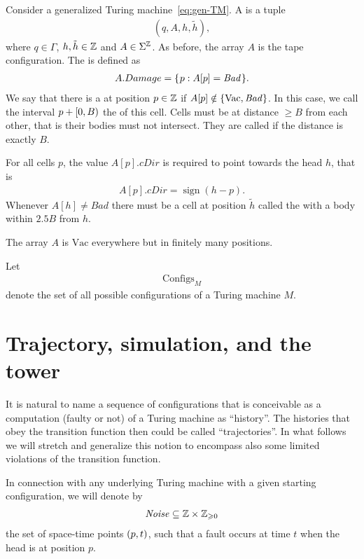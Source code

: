 \documentclass[12pt]{memoir}
\newcommand{\fld}[1]{\ensuremath{\textit{#1}}}
\newcommand{\sign}{\mathop\mathrm{sign}}
\def\B{B}
\newcommand{\Bad}{\mathit{Bad}}
\newcommand{\Configs}{\mathrm{Configs}}
\newcommand{\Damage}{Damage}
\newcommand{\h}{h}
\newcommand{\hc}{\tilde h}
\newcommand{\Noise}{\mathit{Noise}}
\newcommand{\cDir}{\fld{cDir}}
\newcommand{\Vacant}{\mathrm{Vac}}
\begin{document}
\begin{definition}[Configuration]\label{def:config}
     Consider a generalized Turing machine~\eqref{eq:gen-TM}.
    A  is a tuple
        \begin{align*}
             (q,A,\h,\hc),
        \end{align*}
    where \( q\in\Gamma \), \( \h,\hc\in\bbZ \) and \( A\in\Sigma^{\mathbb{Z}} \).
As before, the array \( A \) is the tape configuration.
The  is defined as
     \begin{align*}
          A.\Damage=\setOf{p}{A[p]=\Bad}.
     \end{align*}
We say that there is a  at position \( p\in\mathbb{Z} \) if
\( A[p]\notin \set{\Vacant, \Bad} \).
In this case, we call the interval \( p+\lint{0}{\B} \) the  of this cell.
Cells must be at distance \( \ge\B \) from each other, that is their
bodies must not intersect.
They are called  if the distance is exactly \( \B \).

For all cells \( p \), the value \( A[p].\cDir \) is required to point towards 
the head \( \h \), that is 
 \begin{align*}
   A[p].\cDir=\sign(\h-p).
 \end{align*}
Whenever \( A[\h]\neq \Bad \) there must be a
cell at position \( \hc \) called the  with a body 
within \( 2.5\B \) from \( \h \).

The array \( A \) is \( \Vacant \) everywhere but in finitely many positions.

Let
    \begin{align*}
         \Configs_{M}
    \end{align*}
    denote the set of all possible configurations
    of a Turing machine \( M \).
\end{definition}

\section{Trajectory, simulation, and the tower}

It is natural to name a sequence of configurations that is conceivable as a computation
(faulty or not) of a Turing machine as ``history''.
The histories that obey the transition function then could be called ``trajectories''.
In what follows we will 
stretch and generalize this notion to encompass also some limited violations of the
transition function.

In connection with any underlying Turing machine with a given starting configuration, we will
denote by
\begin{align}\label{eq:noise-first}
   \Noise\subseteq \bbZ\times \bbZ_{\ge 0}
\end{align}
the set of space-time points \( (p,t) \), such that
a fault occurs at time \( t \) when the head is at position \( p \).
\end{document}
